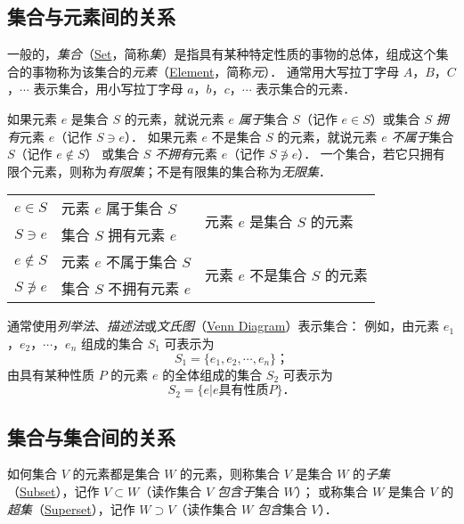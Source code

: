 \subsection{集合与元素间的关系}
%
一般的，\emph{集合}（\href{http://mathworld.wolfram.com/Set.html}{Set}，简称\emph{集}）是指具有某种特定性质的事物的总体，组成这个集合的事物称为该集合的\emph{元素}（\href{http://mathworld.wolfram.com/Element.html}{Element}，简称\emph{元}）．
通常用大写拉丁字母 $A$，$B$，$C$，$\cdots$ 表示集合，用小写拉丁字母 $a$，$b$，$c$，$\cdots$ 表示集合的元素．

如果元素 $e$ 是集合 $S$ 的元素，就说元素 $e$ \emph{属于}集合 $S$（记作 $e\in{}S$）或集合 $S$ \emph{拥有}元素 $e$（记作 $S\ni{}e$）．
如果元素 $e$ 不是集合 $S$ 的元素，就说元素 $e$ \emph{不属于}集合 $S$（记作 $e\not\in{}S$） 或集合 $S$ \emph{不拥有}元素 $e$（记作 $S\not\ni{}e$）．
一个集合，若它只拥有限个元素，则称为\emph{有限集}；不是有限集的集合称为\emph{无限集}．

\begin{table}[h]
	\centering
	\begin{tabular}{l l l}
		\hline
		$e\in{}S$     & 元素 $e$ 属于集合 $S$   & \multirow{2}{*}{元素 $e$ 是集合 $S$ 的元素}   \\
		$S\ni{}e$     & 集合 $S$ 拥有元素 $e$   &                                               \\
		$e\not\in{}S$ & 元素 $e$ 不属于集合 $S$ & \multirow{2}{*}{元素 $e$ 不是集合 $S$ 的元素} \\
		$S\not\ni{}e$ & 集合 $S$ 不拥有元素 $e$ &                                               \\
		\hline
	\end{tabular}
\end{table}

通常使用\emph{列举法}、\emph{描述法}或\emph{文氏图}（\href{http://mathworld.wolfram.com/VennDiagram.html}{Venn Diagram}）表示集合：
例如，由元素 $e_1$，$e_2$，$\cdots$，$e_n$ 组成的集合 $S_1$ 可表示为
\[ S_1 = \{ e_1, e_2, \cdots, e_n \} \text{；} \]
由具有某种性质 $P$ 的元素 $e$ 的全体组成的集合 $S_2$ 可表示为
\[ S_2 = \{ e | e \text{具有性质} P \} \text{．} \]
%

\subsection{集合与集合间的关系}
%
如何集合 $V$ 的元素都是集合 $W$ 的元素，则称集合 $V$ 是集合 $W$ 的\emph{子集}（\href{http://mathworld.wolfram.com/Subset.html}{Subset}），记作 $V\subset{}W$（读作集合 $V$ \emph{包含于}集合 $W$）；
或称集合 $W$ 是集合 $V$ 的\emph{超集}（\href{http://mathworld.wolfram.com/Superset.html}{Superset}），记作 $W\supset{}V$（读作集合 $W$ \emph{包含}集合 $V$）．

